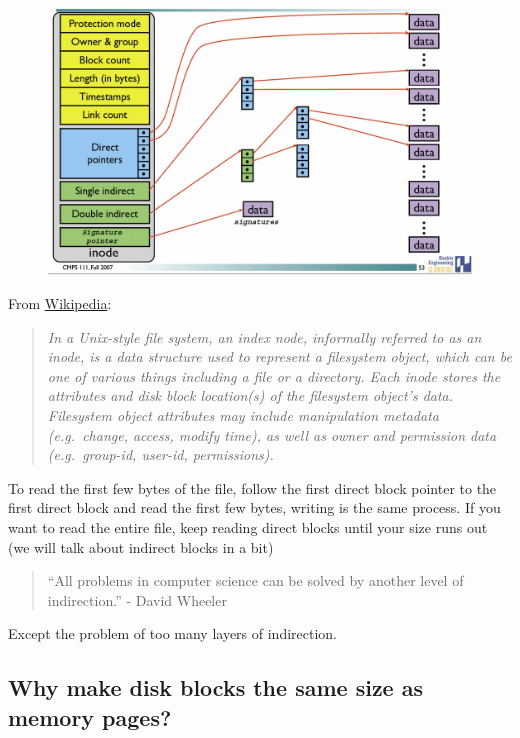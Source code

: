 \begin{figure}[htbp]
\centering
\includegraphics[width=.8\textwidth]{filesystems/images/inode_with_signatures.jpg}
\caption{}
\end{figure}

From \href{http://en.wikipedia.org/wiki/Inode}{Wikipedia}:

\begin{quote}
\emph{In a Unix-style file system, an index node, informally referred to as an inode, is a data structure used to represent a filesystem object, which can be one of various things including a file or a directory. Each inode stores the attributes and disk block location(s) of the filesystem object's data. Filesystem object attributes may include manipulation metadata (e.g.~change, access, modify time), as well as owner and permission data (e.g.~group-id, user-id, permissions).}
\end{quote}

To read the first few bytes of the file, follow the first direct block pointer to the first direct block and read the first few bytes, writing is the same process. If you want to read the entire file, keep reading direct blocks until your size runs out (we will talk about indirect blocks in a bit)

\begin{quote}
``All problems in computer science can be solved by another level of indirection.'' - David Wheeler
\end{quote}

Except the problem of too many layers of indirection.

\subsection{Why make disk blocks the same size as memory pages?}\label{why-make-disk-blocks-the-same-size-as-memory-pages}

